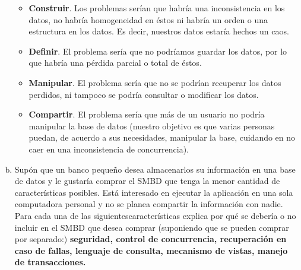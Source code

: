 \documentclass[letterpaper,12pt]{article}
\begin{document}
\begin{enumerate}[a. ]
	\begin{itemize}

		\item \textbf{Construir}. Los problemas serían que habría una inconsistencia en los datos, no habría homogeneidad en éstos ni habría un orden o una estructura en los datos. Es decir, nuestros datos estaría hechos un caos. 
		\item \textbf{Definir}. El problema sería que no podríamos guardar los datos, por lo que habría una pérdida parcial o total de éstos.
		\item \textbf{Manipular}. El problema sería que no se podrían recuperar los datos perdidos, ni tampoco se podría consultar o modificar los datos. 

		\item \textbf{Compartir}. El problema sería que  más de un usuario no podría manipular la base de datos (nuestro objetivo es que varias personas puedan, de acuerdo a sus necesidades, manipular la base, cuidando en no caer en una inconsistencia de concurrencia).

	\end{itemize}


            \item Supón que un banco pequeño desea almacenarlos su información en una base de datos y le gustaría comprar el SMBD que tenga la menor cantidad de características posibles. Está interesado en ejecutar la aplicación en una sola computadora personal y no se planea compartir la información con nadie. Para cada una de las siguientescaracterísticas explica por qué se debería o no incluir en el SMBD que desea comprar (suponiendo que se pueden comprar por separado:) \textbf{seguridad, control de concurrencia, recuperación en caso de fallas, lenguaje de consulta, mecanismo de vistas, manejo de transacciones.} \\
          \end{enumerate}
\end{document}
